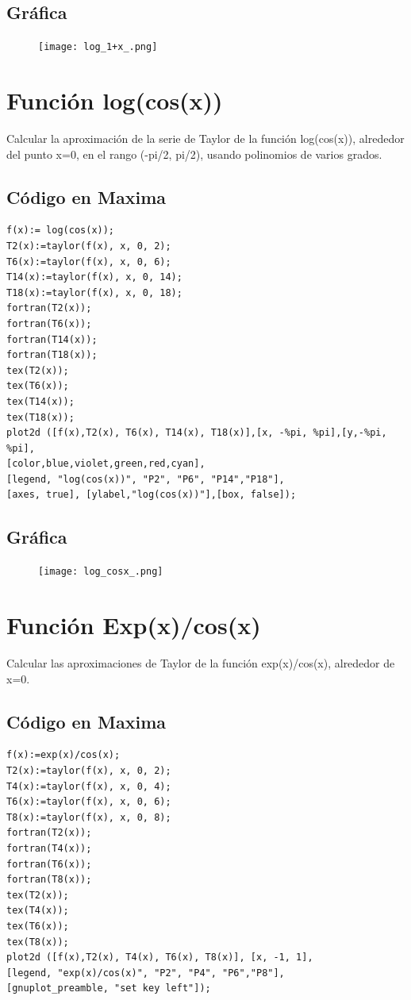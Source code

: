 \documentclass[a4paper]{article}
\begin{document}
\subsection{Gráfica}

\begin{figure}[h]
\centering
\texttt{[image: log\_1+x\_.png]}
\end{figure}

\section{Función log(cos(x))}
Calcular la aproximación de la serie de Taylor de la función log(cos(x)), alrededor del punto  x=0, en el rango (-pi/2, pi/2), usando polinomios de varios grados.

\subsection{Código en Maxima}
 \begin{verbatim}
f(x):= log(cos(x));
T2(x):=taylor(f(x), x, 0, 2);
T6(x):=taylor(f(x), x, 0, 6);
T14(x):=taylor(f(x), x, 0, 14);
T18(x):=taylor(f(x), x, 0, 18);
fortran(T2(x));
fortran(T6(x));
fortran(T14(x));
fortran(T18(x));
tex(T2(x));
tex(T6(x));
tex(T14(x));
tex(T18(x));
plot2d ([f(x),T2(x), T6(x), T14(x), T18(x)],[x, -%pi, %pi],[y,-%pi, %pi],
[color,blue,violet,green,red,cyan],
[legend, "log(cos(x))", "P2", "P6", "P14","P18"],
[axes, true], [ylabel,"log(cos(x))"],[box, false]);
\end{verbatim}

\subsection{Gráfica}

\begin{figure}[h]
\centering
\texttt{[image: log\_cosx\_.png]}
\end{figure}

\section{Función Exp(x)/cos(x)}
 Calcular las aproximaciones de Taylor de la función exp(x)/cos(x), alrededor de x=0.
 
 \subsection{Código en Maxima}
 \begin{verbatim}
f(x):=exp(x)/cos(x);
T2(x):=taylor(f(x), x, 0, 2);
T4(x):=taylor(f(x), x, 0, 4);
T6(x):=taylor(f(x), x, 0, 6);
T8(x):=taylor(f(x), x, 0, 8);
fortran(T2(x));
fortran(T4(x));
fortran(T6(x));
fortran(T8(x));
tex(T2(x));
tex(T4(x));
tex(T6(x));
tex(T8(x));
plot2d ([f(x),T2(x), T4(x), T6(x), T8(x)], [x, -1, 1],
[legend, "exp(x)/cos(x)", "P2", "P4", "P6","P8"],
[gnuplot_preamble, "set key left"]);
\end{verbatim}
\end{document}
